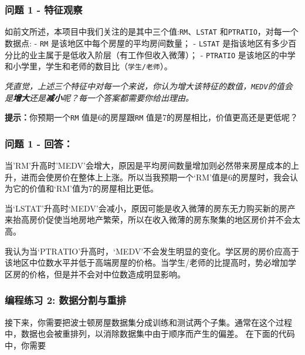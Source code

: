 \documentclass[11pt]{article}
\begin{document}
    \subsubsection{问题 1 -
特征观察}\label{ux95eeux9898-1---ux7279ux5f81ux89c2ux5bdf}

如前文所述，本项目中我们关注的是其中三个值:\texttt{\textquotesingle{}RM\textquotesingle{}}、\texttt{\textquotesingle{}LSTAT\textquotesingle{}}
和\texttt{\textquotesingle{}PTRATIO\textquotesingle{}}，对每一个数据点:
- \texttt{\textquotesingle{}RM\textquotesingle{}}
是该地区中每个房屋的平均房间数量； -
\texttt{\textquotesingle{}LSTAT\textquotesingle{}}
是指该地区有多少百分比的业主属于是低收入阶层（有工作但收入微薄）； -
\texttt{\textquotesingle{}PTRATIO\textquotesingle{}}
是该地区的中学和小学里，学生和老师的数目比（\texttt{学生/老师}）。

\emph{凭直觉，上述三个特征中对每一个来说，你认为增大该特征的数值，\texttt{\textquotesingle{}MEDV\textquotesingle{}}的值会是\textbf{增大}还是\textbf{减小}呢？每一个答案都需要你给出理由。}

\textbf{提示：}你预期一个\texttt{\textquotesingle{}RM\textquotesingle{}}
值是6的房屋跟\texttt{\textquotesingle{}RM\textquotesingle{}}
值是7的房屋相比，价值更高还是更低呢？

    \subsubsection{问题 1 - 回答：}\label{ux95eeux9898-1---ux56deux7b54}

当'RM'升高时'MEDV'会增大，原因是平均房间数量增加则必然带来房屋成本的上升，进而会使房价在整体上上涨。所以当我预期一个`RM'值是6的房屋时，我会认为它的价值和`RM'值为7的房屋相比更低。

当`LSTAT'升高时`MEDV'会减小，原因可能是收入微薄的房东无力购买新的房产来抬高房价促使当地房地产繁荣，所以在收入微薄的房东聚集的地区房价并不会太高。

我认为当`PTRATIO'升高时，`MEDV'不会发生明显的变化。学区房的房价应高于该地区中位数水平并低于高端房屋的价格。当学生/老师的比提高时，势必增加学区房的价格，但是并不会对中位数造成明显影响。

    \subsubsection{编程练习 2:
数据分割与重排}\label{ux7f16ux7a0bux7ec3ux4e60-2-ux6570ux636eux5206ux5272ux4e0eux91cdux6392}

接下来，你需要把波士顿房屋数据集分成训练和测试两个子集。通常在这个过程中，数据也会被重排列，以消除数据集中由于顺序而产生的偏差。
在下面的代码中，你需要
\end{document}
